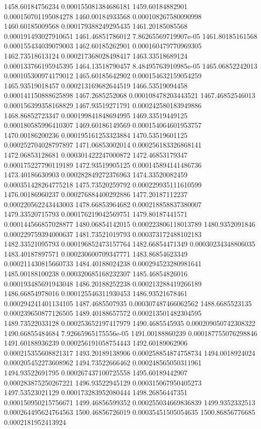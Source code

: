 {1458.60184756234 0.000155081384686181
1459.60184882901 0.000150701195084278
1460.00184933568 0.000108267580090998
1460.60185009568 0.000179388249295435
1461.20185085568 0.000191493027910651
1461.46851786012 7.86265569719907e-05
1461.80185161568 0.000155434039079003
1462.60185262901 0.000160479770969305
1462.73518613124 0.000217368028498417
1463.33518689124 0.000133766195945395
1464.13518790457 8.48495763910985e-05
1465.06852242013 0.000105300974179012
1465.60185642902 0.000154632159054259
1465.93519018457 0.000213169682644519
1466.53519094458 0.000141150888625898
1467.2685252068 0.000108478203443521
1467.46852546013 0.000156399358168829
1467.93519271791 0.000242580183949886
1468.86852723347 0.000199841848694995
1469.33519449125 0.000180585996410307
1469.60186149569 0.000154064601953757
1470.00186200236 0.000195161253323884
1470.53519601125 0.000252704028797897
1471.06853002014 0.000256183326868141
1472.06853128681 0.000301422247000872
1472.46853179347 0.000175227790119189
1472.93519905125 0.000145894141486736
1473.40186630903 0.000282849272376963
1474.33520082459 0.000351428264775218
1475.73520259792 0.000229935111610599
1476.00186960237 0.000276884400292886
1477.20187112237 0.000220562243443003
1478.66853964682 0.000218858837380007
1479.33520715793 0.000176219042569751
1479.80187441571 0.000144566857028877
1480.06854142015 0.000223806118013789
1480.9352091846 0.000229759394000637
1481.73521019793 0.000373172488102183
1482.33521095793 0.000196852473157764
1482.66854471349 0.00030234348806035
1483.40187897571 0.000230600709347771
1483.86854623349 0.000211430815660733
1484.40188024238 0.000294523280981641
1485.00188100238 0.000320685168232307
1485.46854826016 0.000193485691943048
1486.20188252238 0.000213288419266189
1486.66854978016 0.000125546311930453
1486.93521678461 0.000294241401134105
1487.4685507935 0.000307487466062562
1488.6685523135 0.000239650877126505
1489.40188657572 0.000213501482304595
1489.73522033128 0.000253652197417979
1490.4685545935 0.000209050742308322
1490.66855484684 7.92665965175556e-05
1491.00188860239 0.000187755076298846
1491.60188936239 0.000256191058754443
1492.60189062906 0.000215355608821317
1493.20189138906 0.000258854874758734
1494.0018924024 0.000205452273608962
1494.73522666462 0.000248565050311961
1494.93522691795 0.000267437100725558
1495.60189442907 0.000283875250267221
1496.93522945129 0.000315067950405273
1497.53523021129 0.000173283952080444
1498.26856447351 0.000150950215756671
1499.46856599352 0.000255034669836839
1499.9352332513 0.000264495624764563
1500.46856726019 0.00035451505054635
1500.86856776685 0.0002181952413924
}
